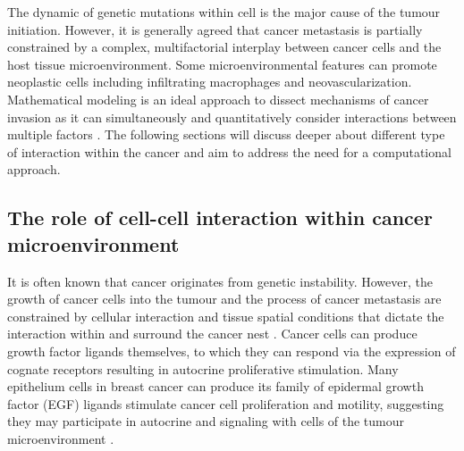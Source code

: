 The dynamic of genetic mutations within cell is the major cause of the tumour initiation. However, it is generally agreed that cancer metastasis is partially constrained by a complex, multifactorial interplay between cancer cells and the host tissue microenvironment. Some microenvironmental features can promote neoplastic cells including infiltrating macrophages and neovascularization. Mathematical modeling is an ideal approach to dissect mechanisms of cancer invasion as it can simultaneously and quantitatively consider interactions between multiple factors \cite{anderson2006tumor}. The following sections will discuss deeper about different type of interaction within the cancer and aim to address the need for a computational approach.       

\subsection{The role of cell-cell interaction within cancer microenvironment}
It is often known that cancer originates from genetic instability. However, the growth of cancer cells into the tumour and the process of cancer metastasis are constrained by cellular interaction and tissue spatial conditions that dictate the interaction within and surround the cancer nest \cite{west2019cellular, liotta2001microenvironment,anderson2006tumor}. Cancer cells can produce growth factor ligands themselves, to which they can respond via the expression of cognate receptors resulting in autocrine proliferative stimulation. Many epithelium cells in breast cancer can produce its family of epidermal growth factor (EGF) ligands stimulate cancer cell proliferation and motility, suggesting they may participate in autocrine and signaling with cells of the tumour microenvironment \cite{nickerson2013autocrine}.  

